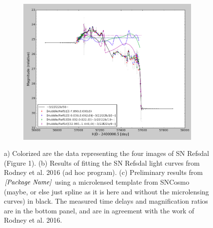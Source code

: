 \begin{figure}
\begin{subfigure}{.3\textwidth}
\includegraphics[width=\linewidth]{supcos.png}
\caption{}\label{fig:fig_c}
\end{subfigure}
\caption{a) Colorized are the data representing the four images of SN Refsdal (Figure 1). (b) Results of fitting the SN Refsdal light curves from Rodney et al. 2016 (ad hoc program). (c) Preliminary results from $\textit{[Package Name]}$ using a microlensed template from SNCosmo (maybe, or else just spline as it is here and without the microlensing curves) in black. The measured time delays and magnification ratios are in the bottom panel, and are in agreement with the work of Rodney et al. 2016.}
\end{figure}

